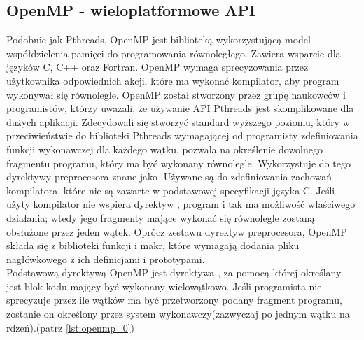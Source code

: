 \documentclass[document.tex]{subfiles}
\begin{document}
\subsection{OpenMP - wieloplatformowe API}
\indent Podobnie jak Pthreads, OpenMP jest biblioteką wykorzystującą
model współdzielenia pamięci do programowania równoległego. Zawiera wsparcie dla języków C, C++ oraz Fortran.
OpenMP wymaga sprecyzowania przez użytkownika odpowiednich akcji, które ma wykonać kompilator, aby program wykonywał się równolegle.
\cite{openmp_pacheco}\cite{openmp_spec}
OpenMP został stworzony przez grupę naukowców i programistów, którzy
uważali, że używanie API Pthreads jest skomplikowane dla dużych
aplikacji. Zdecydowali się stworzyć standard wyższego poziomu, który
w przeciwieństwie do biblioteki Pthreads wymagającej od programisty zdefiniowania funkcji wykonawczej dla każdego wątku, pozwala 
na określenie dowolnego fragmentu programu, który ma być wykonany 
równolegle. Wykorzystuje do tego dyrektywy preprocesora znane jako
.Używane są do zdefiniowania zachowań kompilatora,
które nie są zawarte w podstawowej specyfikacji języka C.
Jeśli użyty kompilator nie wspiera dyrektyw , program
i tak ma możliwość właściwego działania; wtedy jego fragmenty mające wykonać
się równolegle zostaną obsłużone przez jeden wątek.
\cite{openmp_pacheco}\cite{C_King}\cite{openmp_spec}\cite{openmp_guide}
Oprócz zestawu dyrektyw preprocesora, OpenMP składa się z biblioteki
funkcji i makr, które wymagają dodania pliku nagłówkowego 
z ich definicjami i prototypami.
\\
\indent Podstawową dyrektywą OpenMP jest dyrektywa ,
za pomocą której określany jest blok kodu mający być wykonany wielowątkowo.
Jeśli programista nie sprecyzuje przez ile wątków
ma być przetworzony podany fragment programu, zostanie on określony przez system
wykonawczy(zazwyczaj po jednym wątku na rdzeń).\cite{openmp_pacheco}\cite{openmp_guide}(patrz \ref{lst:openmp_0})
\\

\end{document}
